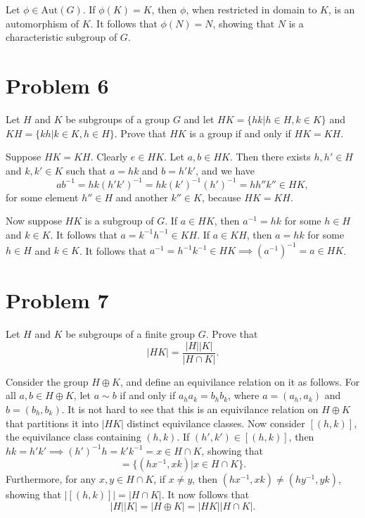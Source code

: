 \documentclass[12pt]{article}
\newcommand{\aut}{\mbox{Aut}}
\begin{document}
Let $\phi\in\aut(G)$.  If $\phi(K)=K$, then $\phi$, when restricted in
domain to $K$, is an automorphism of $K$.  It follows that
$\phi(N)=N$, showing that $N$ is a characteristic subgroup of $G$.

\section*{Problem 6}

Let $H$ and $K$ be subgroups of a group $G$ and let $HK=\{hk|h\in H,k\in K\}$
and $KH=\{kh|k\in K,h\in H\}$.  Prove that $HK$ is a group if and only if
$HK=KH$.

Suppose $HK=KH$.  Clearly $e\in HK$.  Let $a,b\in HK$.
Then there exists $h,h'\in H$ and $k,k'\in K$ such that
$a=hk$ and $b=h'k'$, and we have
\begin{equation*}
ab^{-1}=hk(h'k')^{-1}=hk(k')^{-1}(h')^{-1} = hh''k''\in HK,
\end{equation*}
for some element $h''\in H$ and another $k''\in K$, because
$HK=KH$.

Now suppose $HK$ is a subgroup of $G$.  If $a\in HK$,
then $a^{-1}=hk$ for some $h\in H$ and $k\in K$.
It follows that $a=k^{-1}h^{-1}\in KH$.
If $a\in KH$, then $a=hk$ for some $h\in H$ and $k\in K$.
It follows that $a^{-1}=h^{-1}k^{-1}\in HK\implies (a^{-1})^{-1}=a\in HK$.

\pagebreak
\section*{Problem 7}

Let $H$ and $K$ be subgroups of a finite group $G$.  Prove that
\begin{equation*}
|HK|=\frac{|H||K|}{|H\cap K|}.
\end{equation*}

Consider the group $H\oplus K$, and define an equivilance
relation on it as follows.  For all $a,b\in H\oplus K$,
let $a\sim b$ if and only if $a_ha_k=b_hb_k$,
where $a=(a_h,a_k)$ and $b=(b_h,b_k)$.  It is not
hard to see that this is an equivilance relation
on $H\oplus K$ that partitions it into $|HK|$
distinct equivilance classes.  Now consider
$[(h,k)]$, the equivilance class containing $(h,k)$.
If $(h',k')\in[(h,k)]$, then $hk=h'k'\implies (h')^{-1}h=k'k^{-1}=x\in H\cap K$,
showing that
\begin{equation*}
[(h,k)]=\{(hx^{-1},xk)|x\in H\cap K\}.
\end{equation*}
Furthermore, for any $x,y\in H\cap K$, if $x\neq y$, then
$(hx^{-1},xk)\neq (hy^{-1},yk)$, showing that
$|[(h,k)]|=|H\cap K|$.  It now follows that
\begin{equation*}
|H||K|=|H\oplus K|=|HK||H\cap K|.
\end{equation*}
\end{document}
